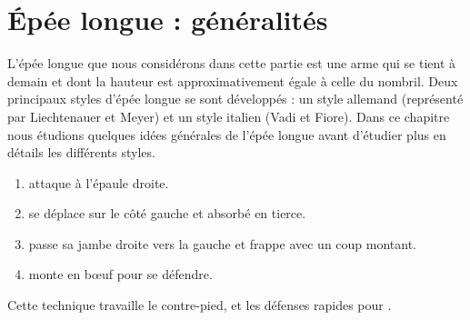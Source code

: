 \chapter{Épée longue : généralités}


L'épée longue que nous considérons dans cette partie est une arme qui se tient à demain et dont la hauteur est approximativement égale à celle du nombril.
Deux principaux styles d'épée longue se sont développés : un style allemand (représenté par Liechtenauer et Meyer) et un style italien (Vadi et Fiore).
Dans ce chapitre nous étudions quelques idées générales de l'épée longue avant d'étudier plus en détails les différents styles.


\begin{technique}

\begin{enumerate}
	\item \A attaque à l'épaule droite.
	
	\item \D se déplace sur le côté gauche et absorbé en tierce.
	
	\item \D passe sa jambe droite vers la gauche et frappe \A avec un coup montant.
	
	\item \A monte en bœuf pour se défendre.
\end{enumerate}

Cette technique travaille le contre-pied, et les défenses rapides pour \A.

\end{technique}


